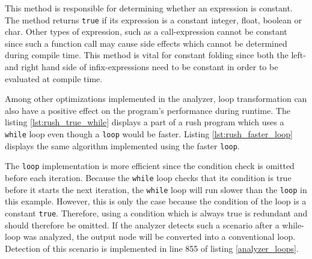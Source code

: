 
This method is responsible for determining whether an expression is constant.
The method returns \texttt{true} if its expression is a constant integer, float, boolean or char.
Other types of expression, such as a call-expression cannot be constant since such a function call may cause side effects which cannot be determined during compile time.
This method is vital for constant folding since both the left- and right hand side of infix-expressions need to be constant in order to be evaluated at compile time.

Among other optimizations implemented in the analyzer, loop transformation can also have a positive effect on the program's performance during runtime.
The listing \ref{lst:rush_true_while} displays a part of a rush program which uses a \texttt{while} loop even though a \texttt{loop} would be faster.
Listing \ref{lst:rush_faster_loop} displays the same algorithm implemented using the faster \texttt{loop}.


The \texttt{loop} implementation is more efficient since the condition check is omitted before each iteration.
Because the \texttt{while} loop checks that its condition is true before it starts the next iteration,
the \texttt{while} loop will run slower than the \texttt{loop} in this example.
However, this is only the case because the condition of the loop is a constant \texttt{true}.
Therefore, using a condition which is always true is redundant and should therefore be omitted.
If the analyzer detects such a scenario after a while-loop was analyzed, the output node will be converted into a conventional loop.
Detection of this scenario is implemented in line 855 of listing \ref{analyzer_loops}.


